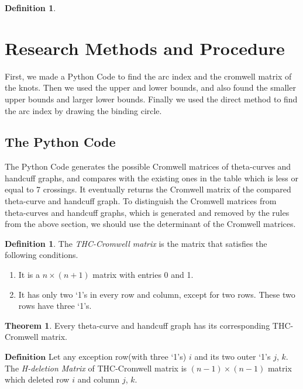\documentclass{article}
\theoremstyle{definition}
\newtheorem{defn}[thm]{Definition}
\theoremstyle{theorem}
\newtheorem{theorem}{Theorem}
\theoremstyle{proposition}
\theoremstyle{corollary}
\begin{document}
\begin{defn}

\section{Research Methods and Procedure}
First, we made a Python Code to find the arc index and the cromwell matrix of the knots. Then we used the upper and lower bounds, and also found the smaller upper bounds and larger lower bounds. Finally we used the direct method to find the arc index by drawing the binding circle.

\subsection{The Python Code}
The Python Code generates the possible Cromwell matrices of theta-curves and handcuff graphs, and compares with the existing ones in the table which is less or equal to 7 crossings.
It eventually returns the Cromwell matrix of the compared theta-curve and handcuff graph.
To distinguish the Cromwell matrices from theta-curves and handcuff graphs, which is generated and removed by the rules from the above section, we should use the determinant of the Cromwell matrices.\\

\begin{defn}
The \textit{THC-Cromwell matrix} is the matrix that satisfies the following conditions.
\end{defn}
\begin{enumerate}
    \item It is a $n\times(n+1)$ matrix with entries 0 and 1.
    \item It has only two `1's in every row and column, except for two rows. These two rows have three `1's.
\end{enumerate}
\begin{theorem}
Every theta-curve and handcuff graph has its corresponding THC-Cromwell matrix.
\end{theorem}
$\mathbf{Definition}$ Let any exception row(with three `1's) $i$ and its two outer `1's $j$, $k$. The \textit{H-deletion Matrix} of THC-Cromwell matrix is $(n-1)\times(n-1)$ matrix which deleted row $i$ and column $j$, $k$.\\


\end{defn}
\end{document}
